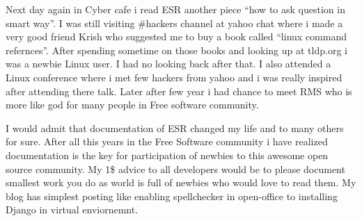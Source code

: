 Next day again in Cyber cafe i read ESR another piece “how to ask question in
smart way”. I was still visiting \#hackers channel at yahoo chat where i made a
very good friend Krish who suggested me to buy a book called “linux command
refernces”.  After spending sometime on those books and looking up at tldp.org i
was a newbie Linux user. I had no looking back after that. I also attended a
Linux conference where i met few hackers from yahoo and i was really inspired
after attending there talk. Later after few year i had chance to meet RMS who is
more like god for many people in Free software community. 

I would admit that documentation of ESR changed my life and to many others for
sure. After all this years in the Free Software community i have realized
documentation is the key for participation of newbies to this awesome open
source community. My 1\$ advice to all developers would be to please document
smallest work you do as world is full of newbies who would love to read them. My
blog has simplest posting like enabling spellchecker in open-office to
installing Django in virtual enviornemnt.
